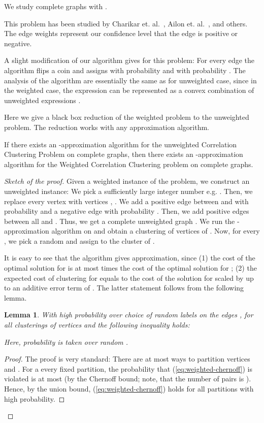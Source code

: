 \documentclass[11pt]{article}
\newtheorem{lemma}[theorem]{Lemma}
\theoremstyle{definition}
\theoremstyle{remark}
\begin{document}
We study complete graphs with .

This problem has been studied by Charikar et. al.~\cite{CGW05}, Ailon et.
al.~\cite{ACN08}, and others. The edge weights represent our confidence level
that the edge is positive or negative.

A slight modification of our algorithm gives  for this problem: For every edge  the algorithm flips a coin and assigns  with probability  and 
with probability . The analysis of the
algorithm are essentially the same as for unweighted case, since in the
weighted case, the expression  can be represented
as a convex combination of unweighted expressions .

Here we give a black box reduction of the weighted problem to the unweighted problem.
The reduction works with any approximation algorithm.

\begin{theorem}
If there exists an -approximation algorithm for the unweighted Correlation Clustering Problem on complete graphs, then there exists an -approximation algorithm
for the Weighted Correlation Clustering problem on complete graphs.
\end{theorem}
\begin{proof}[Sketch of the proof]
Given a weighted instance of the problem, we construct an unweighted instance:
We pick a sufficiently large integer number  e.g. . Then, we replace
every vertex  with  vertices , . We add a positive edge between
 and  with probability  and a negative edge with
probability . Then, we add positive edges between all  and .
Thus, we get a complete unweighted graph . We run the -approximation algorithm
on  and obtain a clustering of vertices of . Now, for every ,
we pick a random  and assign  to the cluster of .

It is easy to see that the algorithm gives  approximation, since
(1) the cost of the optimal solution for  is at most  times the cost of the optimal
solution for ; (2) the expected cost of clustering for   equals to the cost of
the solution for  scaled by  up to
an additive error term of . The latter statement follows from the following lemma.

\begin{lemma}
With high probability over choice of random labels  on the edges ,
for all clusterings of vertices  and  the following inequality holds:

Here, probability is taken over random .
\end{lemma}
\begin{proof}
The proof is very standard: There are at most  ways to partition
vertices  and . For a every fixed partition, the probability that
(\ref{eq:weighted-chernoff}) is violated is at most  (by the
Chernoff bound; note, that the number of pairs  is ). Hence, by the union bound,
(\ref{eq:weighted-chernoff}) holds for all partitions with high probability.
\end{proof}
\end{proof}
\end{document}
